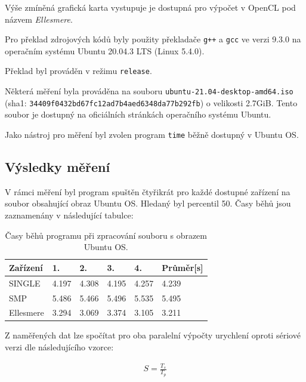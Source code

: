 \documentclass[12pt, a4paper]{article}
\begin{document}
Výše zmíněná grafická karta vystupuje je dostupná pro výpočet v OpenCL pod názvem \textit{Ellesmere}.

Pro překlad zdrojových kódů byly použity překladače \texttt{g++} a \texttt{gcc} ve verzi 9.3.0 na operačním systému Ubuntu 20.04.3 LTS (Linux 5.4.0).

Překlad byl prováděn v režimu \texttt{release}.  

Některá měření byla prováděna na souboru \texttt{ubuntu-21.04-desktop-amd64.iso} (sha1: \texttt{34409f0432bd67fc12ad7b4aed6348da77b292fb}) o velikosti 2.7GiB. Tento soubor je dostupný na oficiálních stránkách operačního systému Ubuntu.

Jako nástroj pro měření byl zvolen program \texttt{time} běžně dostupný v Ubuntu OS.

\subsection{Výsledky měření}

V rámci měření byl program spuštěn čtyřikrát pro každé dostupné zařízení na soubor obsahující obraz Ubuntu OS. Hledaný byl percentil 50.
Časy běhů jsou zaznamenány v následující tabulce: 

\begin{table}[!ht]
    \begin{center}
        \begin{tabular}{ | m{6.5em} || m{1.5cm}| m{1.5cm} | m{1.5cm} | m{1.5cm} || m{1.7cm} |} 
             \hline
             Zařízení & 1. & 2. & 3. & 4. & Průměr[s] \\ 

             \hline
             \hline
              SINGLE &  4.197 & 4.308 & 4.195 & 4.257 & 4.239 \\  
              SMP & 5.486 & 5.466 & 5.496 & 5.535 & 5.495 \\
              Ellesmere & 3.294 & 3.069 & 3.374 & 3.105 & 3.211 \\

             \hline
        \end{tabular}
    \end{center}
    \caption{Časy běhů programu při zpracování souboru s obrazem Ubuntu OS.}
\end{table}

Z naměřených dat lze spočítat pro oba paralelní výpočty urychlení oproti sériové verzi dle následujícího vzorce:

\begin{equation}
    \begin{split}
    S = \frac{T_s}{T_p} \\ 
    \end{split}
\end{equation}
\end{document}
